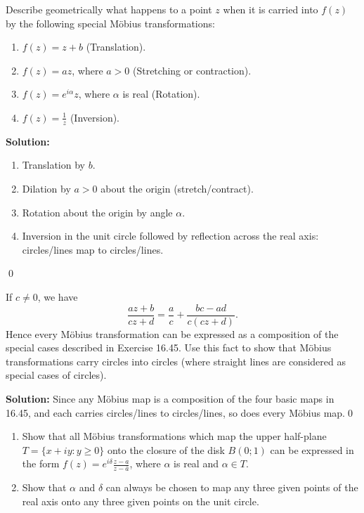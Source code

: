 \begin{problembox}
Describe geometrically what happens to a point \( z \) when it is carried into \( f(z) \) by the following special Möbius transformations:
\begin{enumerate}[label=(\alph*)]
\item \( f(z) = z + b \) (Translation).
\item \( f(z) = a z \), where \( a > 0 \) (Stretching or contraction).
\item \( f(z) = e^{i \alpha} z \), where \( \alpha \) is real (Rotation).
\item \( f(z) = \frac{1}{z} \) (Inversion).
\end{enumerate}
\end{problembox}

\bigskip\noindent\textbf{Solution:}
\begin{enumerate}[label=(\alph*)]
\item Translation by $b$.
\item Dilation by $a>0$ about the origin (stretch/contract).
\item Rotation about the origin by angle $\alpha$.
\item Inversion in the unit circle followed by reflection across the real axis: circles/lines map to circles/lines.
\end{enumerate}\qed


\begin{problembox}
If \( c \neq 0 \), we have
\[ \frac{a z + b}{c z + d} = \frac{a}{c} + \frac{b c - a d}{c (c z + d)}. \]
Hence every Möbius transformation can be expressed as a composition of the special cases described in Exercise 16.45. Use this fact to show that Möbius transformations carry circles into circles (where straight lines are considered as special cases of circles).
\end{problembox}

\bigskip\noindent\textbf{Solution:}
Since any Möbius map is a composition of the four basic maps in 16.45, and each carries circles/lines to circles/lines, so does every Möbius map.\qed


\begin{problembox}
\begin{enumerate}[label=(\alph*)]
\item Show that all Möbius transformations which map the upper half-plane \( T = \{ x + i y : y \geq 0 \} \) onto the closure of the disk \( B(0; 1) \) can be expressed in the form \( f(z) = e^{i \delta} \frac{z - a}{z - \bar{a}} \), where \( \alpha \) is real and \( \alpha \in T \).
\item Show that \( \alpha \) and \( \delta \) can always be chosen to map any three given points of the real axis onto any three given points on the unit circle.
\end{enumerate}
\end{problembox}

